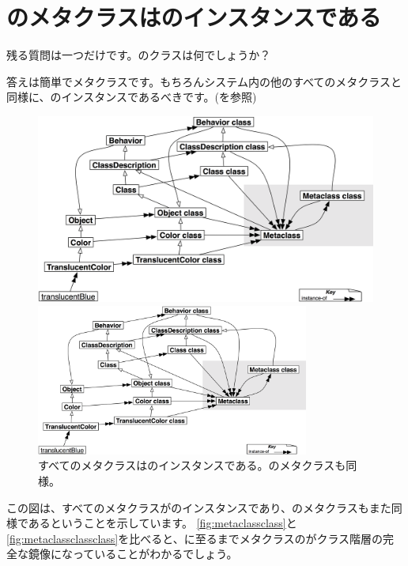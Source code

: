 \documentclass[a4paper,10pt,twoside]{book}
\begin{document}
\section{のメタクラスはのインスタンスである}

残る質問は一つだけです。のクラスは何でしょうか？

答えは簡単でメタクラスです。もちろんシステム内の他のすべてのメタクラスと同様に、のインスタンスであるべきです。(を参照)

\begin{center}
\begin{figure}
\ifluluelse
	{\centerline{\includegraphics[width=\textwidth]{TranslucentMetaclassClassClass}}}
	{\centerline{\includegraphics[width=0.8\textwidth]{TranslucentMetaclassClassClass}}}
\caption{すべてのメタクラスはのインスタンスである。のメタクラスも同様。}
\end{figure}
\end{center}

この図は、すべてのメタクラスがのインスタンスであり、のメタクラスもまた同様であるということを示しています。
\ref{fig:metaclassclass}と\ref{fig:metaclassclassclass}を比べると、に至るまでメタクラスのがクラス階層の完全な鏡像になっていることがわかるでしょう。
\end{document}
